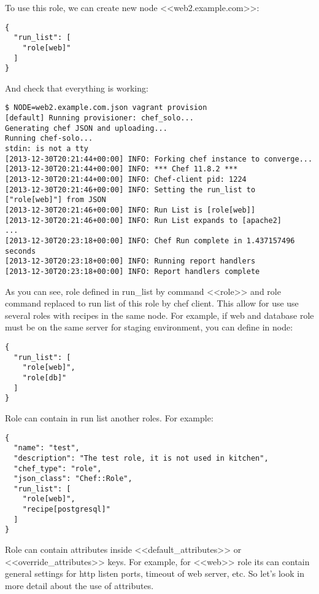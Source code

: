 To use this role, we can create new node <<web2.example.com>>:

\begin{lstlisting}[label=lst:my-cloud-role2,title=my-cloud/nodes/web2.example.com.json]
{
  "run_list": [
    "role[web]"
  ]
}
\end{lstlisting}

And check that everything is working:

\begin{lstlisting}[label=lst:my-cloud-role3,title=my-cloud/nodes/Vagrantfile]
$ NODE=web2.example.com.json vagrant provision
[default] Running provisioner: chef_solo...
Generating chef JSON and uploading...
Running chef-solo...
stdin: is not a tty
[2013-12-30T20:21:44+00:00] INFO: Forking chef instance to converge...
[2013-12-30T20:21:44+00:00] INFO: *** Chef 11.8.2 ***
[2013-12-30T20:21:44+00:00] INFO: Chef-client pid: 1224
[2013-12-30T20:21:46+00:00] INFO: Setting the run_list to ["role[web]"] from JSON
[2013-12-30T20:21:46+00:00] INFO: Run List is [role[web]]
[2013-12-30T20:21:46+00:00] INFO: Run List expands to [apache2]
...
[2013-12-30T20:23:18+00:00] INFO: Chef Run complete in 1.437157496 seconds
[2013-12-30T20:23:18+00:00] INFO: Running report handlers
[2013-12-30T20:23:18+00:00] INFO: Report handlers complete
\end{lstlisting}

As you can see, role defined in run\_list by command <<role>> and role command replaced to run list of this role by chef client. This allow for use use several roles with recipes in the same node. For example, if web and database role must be on the same server for staging environment, you can define in node:

\begin{lstlisting}[label=lst:my-cloud-role4,title=my-cloud/nodes/web2.example.com.json]
{
  "run_list": [
    "role[web]",
    "role[db]"
  ]
}
\end{lstlisting}

Role can contain in run list another roles. For example:

\begin{lstlisting}[label=lst:my-cloud-role5,title=my-cloud/roles/test.json]
{
  "name": "test",
  "description": "The test role, it is not used in kitchen",
  "chef_type": "role",
  "json_class": "Chef::Role",
  "run_list": [
    "role[web]",
    "recipe[postgresql]"
  ]
}
\end{lstlisting}

Role can contain attributes inside <<default\_attributes>> or <<override\_attributes>> keys. For example, for <<web>> role its can contain general settings for http listen ports, timeout of web server, etc. So let's look in more detail about the use of attributes.